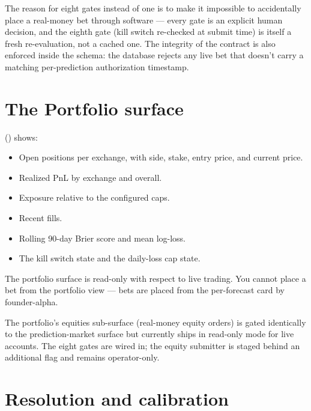 \documentclass[11pt]{article}
\begin{document}
The reason for eight gates instead of one is to make it impossible to
accidentally place a real-money bet through software --- every gate
is an explicit human decision, and the eighth gate (kill switch
re-checked at submit time) is itself a fresh re-evaluation, not a
cached one. The integrity of the contract is also enforced inside the
schema: the database rejects any live bet that doesn't carry a
matching per-prediction authorization timestamp.

\section{The Portfolio surface}

 () shows:

\begin{itemize}[leftmargin=*,itemsep=0.2em]
  \item Open positions per exchange, with side, stake, entry price,
        and current price.
  \item Realized PnL by exchange and overall.
  \item Exposure relative to the configured caps.
  \item Recent fills.
  \item Rolling 90-day Brier score and mean log-loss.
  \item The kill switch state and the daily-loss cap state.
\end{itemize}


The portfolio surface is read-only with respect to live trading. You
cannot place a bet from the portfolio view --- bets are placed from
the per-forecast card by founder-alpha.

\begin{preview}
The portfolio's equities sub-surface (real-money equity orders) is
gated identically to the prediction-market surface but currently
ships in read-only mode for live accounts. The eight gates are wired
in; the equity submitter is staged behind an additional flag and
remains operator-only.
\end{preview}

\section{Resolution and calibration}
\end{document}
